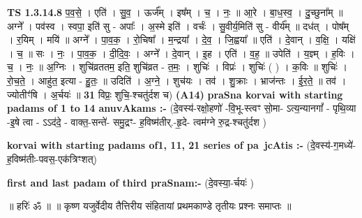 \documentclass[17pt]{extarticle}
\begin{document}
                  \newline
                                \textbf{ TS 1.3.14.8} \newline
                  प॒व॒से॒ । एति॑ । सु॒व॒ । ऊर्ज᳚म् । इष᳚म् । च॒ । नः॒ ॥ आ॒रे । बा॒ध॒स्व॒ । दु॒च्छुना᳚म् ॥ अग्ने᳚ । पव॑स्व । स्वपा॒ इति॑ सु - अपाः᳚ । अ॒स्मे इति॑ । वर्चः॑ । सु॒वीर्य॒मिति॑ सु - वीर्य᳚म् ॥ दध॑त् । पोष᳚म् । र॒यिम् । मयि॑ ॥ अग्ने᳚ । पा॒व॒क॒ । रो॒चिषा᳚ । म॒न्द्रया᳚ । दे॒व॒ । जि॒ह्वया᳚ ॥ एति॑ । दे॒वान् । व॒क्षि॒ । यक्षि॑ । च॒ ॥ सः । नः॒ । पा॒व॒क॒ । दी॒दि॒वः॒ । अग्ने᳚ । दे॒वान् । इ॒ह । एति॑ । व॒ह॒ ॥ उपेति॑ । य॒ज्ञ्म् । ह॒विः । च॒ । नः॒ ॥ अ॒ग्निः । शुचि॑व्रततम॒ इति॒ शुचि॑व्रत - त॒मः॒ । शुचिः॑ । विप्रः॑ । शुचिः॑ ( ) । क॒विः ॥ शुचिः॑ । रो॒च॒ते॒ । आहु॑त॒ इत्या - हु॒तः॒ ॥ उदिति॑ । अ॒ग्ने॒ । शुच॑यः । तव॑ । शु॒क्राः । भ्राज॑न्तः । ई॒र॒ते॒ ॥ तव॑ । ज्योतीꣳ॑षि । अ॒र्चयः॑ ॥ \textbf{  31} \newline
                  \newline
                      विप्रः॒ शुचि॒-श्चतु॑र्दश च)  \textbf{(A14)} \newline \newline
\textbf{praSna korvai with starting padams of 1 to 14 anuvAkams :-} \newline
(दे॒वस्य॑-रक्षो॒हणो॑ -वि॒भू-स्त्वꣳ सो॒मा- ऽत्य॒न्यानगां᳚ - पृथि॒व्या -इ॒षे त्वा - ऽऽद॑दे॒ - वाक्त॒-सन्ते॑- समु॒द्रꣳ- ह॒विष्म॑तीर्.-हृ॒दे- त्वम॑ग्ने रु॒द्र-श्चतु॑र्दश ) \newline

\textbf{korvai with starting padams of1, 11, 21 series of pa~jcAtis :-} \newline
(दे॒वस्य॑-ग॒मध्ये॑-ह॒विष्म॑तीः-पवस॒-एक॑त्रिꣳशत्) \newline

\textbf{first and last padam of third praSnam:-} \newline
(दे॒वस्या॒-र्चयः॑ ) \newline 


॥ हरिः॑ ॐ ॥
॥ कृष्ण यजुर्वेदीय तैत्तिरीय संहितायां प्रथमकाण्डे तृतीयः प्रश्नः समाप्तः ॥ \newline
\pagebreak
\pagebreak
        
\end{document}
